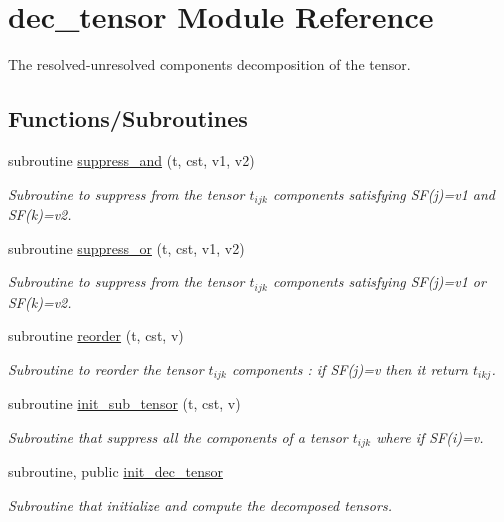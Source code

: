 \hypertarget{namespacedec__tensor}{}\section{dec\+\_\+tensor Module Reference}
\label{namespacedec__tensor}


The resolved-\/unresolved components decomposition of the tensor.  


\subsection*{Functions/\+Subroutines}
\begin{DoxyCompactItemize}
\item 
subroutine \hyperlink{namespacedec__tensor_ab08c915c2a920d5cc6c0e47b21f696dc}{suppress\+\_\+and} (t, cst, v1, v2)
\begin{DoxyCompactList}\small\item\em Subroutine to suppress from the tensor $t_{ijk}$ components satisfying S\+F(j)=v1 and S\+F(k)=v2. \end{DoxyCompactList}\item 
subroutine \hyperlink{namespacedec__tensor_a03a1804765394ccacbb505b3604904a7}{suppress\+\_\+or} (t, cst, v1, v2)
\begin{DoxyCompactList}\small\item\em Subroutine to suppress from the tensor $t_{ijk}$ components satisfying S\+F(j)=v1 or S\+F(k)=v2. \end{DoxyCompactList}\item 
subroutine \hyperlink{namespacedec__tensor_ae780336fa841c576c2e4933365a59be7}{reorder} (t, cst, v)
\begin{DoxyCompactList}\small\item\em Subroutine to reorder the tensor $t_{ijk}$ components \+: if S\+F(j)=v then it return $t_{ikj}$. \end{DoxyCompactList}\item 
subroutine \hyperlink{namespacedec__tensor_a2379bf5216a994cb1811e57f5957d477}{init\+\_\+sub\+\_\+tensor} (t, cst, v)
\begin{DoxyCompactList}\small\item\em Subroutine that suppress all the components of a tensor $t_{ijk}$ where if S\+F(i)=v. \end{DoxyCompactList}\item 
subroutine, public \hyperlink{namespacedec__tensor_ad5519f1ab9898c840a182152efe30240}{init\+\_\+dec\+\_\+tensor}
\begin{DoxyCompactList}\small\item\em Subroutine that initialize and compute the decomposed tensors. \end{DoxyCompactList}\end{DoxyCompactItemize}
